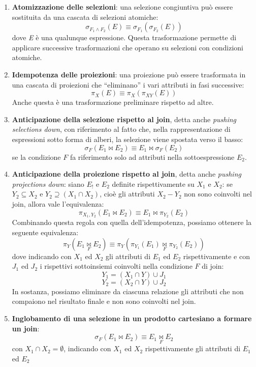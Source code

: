 \documentclass[12pt]{report}
\begin{document}
 	\begin{enumerate}
 		\item \textbf{Atomizzazione delle selezioni}: una selezione congiuntiva può essere sostituita da una cascata di selezioni atomiche:
 		\[
 		\sigma_{F_1 \wedge F_2}(E) \equiv \sigma_{F_1}(\sigma_{F_2}(E))
 		\]
 		dove \textit{E} è una qualunque espressione. Questa trasformazione permette di applicare successive trasformazioni che operano su selezioni con condizioni atomiche.
 		\item \textbf{Idempotenza delle proiezioni}: una proiezione può essere trasformata in una cascata di proiezioni che ``eliminano'' i vari attributi in fasi successive:
 		\[
 		\pi_{X}(E) \equiv \pi_{X}(\pi_{XY}(E))
 		\]
 		Anche questa è una trasformazione preliminare rispetto ad altre.
 		\item \textbf{Anticipazione della selezione rispetto al join}, detta anche \textit{pushing selections down}, con riferimento al fatto che, nella rappresentazione di espressioni sotto forma di alberi, la selezione viene spostata verso il basso:
 		\[
 		\sigma_{F}(E_1 \bowtie E_2) \equiv E_1 \bowtie \sigma_F(E_2)
 		\]
 		se la condizione $F$ fa riferimento solo ad attributi nella sottoespressione $E_2$.
 		\item \textbf{Anticipazione della proiezione rispetto al join}, detta anche \textit{pushing projections down}: siano $E_!$  e $E_2$ definite rispettivamente su $X_1$ e $X_2$: se $Y_2 \subseteq X_2$ e $Y_2 \supseteq (X_1 \cap X_2)$, cioè gli attributi $X_2 - Y_2$ non sono coinvolti nel join, allora vale l'equivalenza:
 		\[
 		\pi_{X_1, Y_2}(E_1 \bowtie E_2) \equiv E_1 \bowtie \pi_{Y_2}(E_2)
 		\]
 		Combinando questa regola con quella dell'idempotenza, possiamo ottenere la seguente equivalenza:
 		\[
 		\pi_Y(E_1 \underset{F}{\bowtie} E_2) \equiv \pi_Y(\pi_{Y_1}(E_1) \underset{F}{\bowtie} \pi_{Y_2}(E_2))
 		\]
 		dove indicando con $X_1$ ed $X_2$ gli attributi di $E_1$ ed $E_2$ rispettivamente e con $J_1$ ed $J_2$ i rispettivi sottoinsiemi coinvolti nella condizione $F$ di join:
 		\[
 		Y_1 = (X_1 \cap Y) \cup J_1
 		\]
 		\[
 		Y_2 = (X_2 \cap Y) \cup J_2
 		\]
 		In sostanza, possiamo eliminare da ciascuna relazione gli attributi che non compaiono nel risultato finale e non sono coinvolti nel join.
 		\item \textbf{Inglobamento di una selezione in un prodotto cartesiano a formare un join}:
 		\[
 		\sigma_F(E_1 \bowtie E_2) \equiv E_1 \underset{F}{\bowtie} E_2
 		\]
 		con $X_1 \cap X_2  = \emptyset$, indicando con $X_1$ ed $X_2$ rispettivamente gli attributi di $E_1$ ed $E_2$
 	\end{enumerate}
\end{document}
